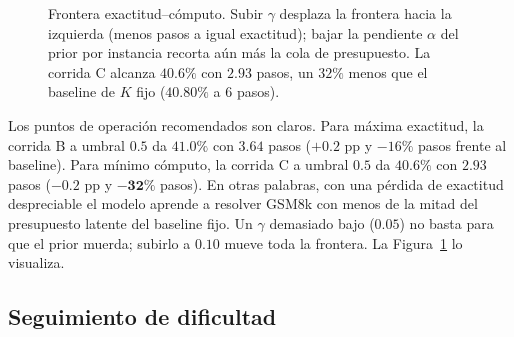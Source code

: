 \documentclass[11pt]{article}
\begin{document}
\begin{figure}[t]
  \centering
  \caption{Frontera exactitud--cómputo. Subir $\gamma$ desplaza la frontera hacia la izquierda (menos pasos a igual exactitud); bajar la pendiente $\alpha$ del prior por instancia recorta aún más la cola de presupuesto. La corrida C alcanza $40.6\%$ con $2.93$ pasos, un $32\%$ menos que el baseline de $K$ fijo ($40.80\%$ a $6$ pasos).}
  \label{fig:frontera}
\end{figure}

Los puntos de operación recomendados son claros. Para máxima exactitud, la corrida B a umbral $0.5$ da $\mathbf{41.0\%}$ con $\mathbf{3.64}$ pasos ($+0.2$ pp y $-16\%$ pasos frente al baseline). Para mínimo cómputo, la corrida C a umbral $0.5$ da $\mathbf{40.6\%}$ con $\mathbf{2.93}$ pasos ($-0.2$ pp y $\mathbf{-32\%}$ pasos). En otras palabras, con una pérdida de exactitud despreciable el modelo aprende a resolver GSM8k con menos de la mitad del presupuesto latente del baseline fijo. Un $\gamma$ demasiado bajo ($0.05$) no basta para que el prior muerda; subirlo a $0.10$ mueve toda la frontera. La Figura~\ref{fig:frontera} lo visualiza.

\subsection{Seguimiento de dificultad}
\label{sec:dificultad}
\end{document}
